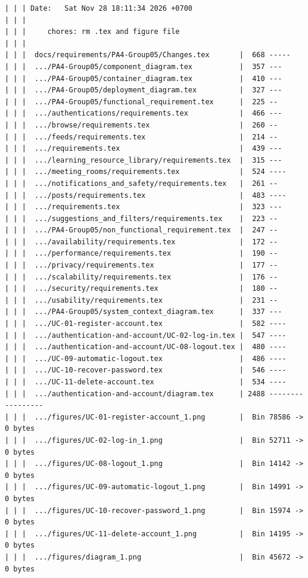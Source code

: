 \documentclass[12pt]{article}
\begin{document}
\begin{lstlisting}[numbers=none,breaklines=true]
| | | Date:   Sat Nov 28 18:11:34 2026 +0700
| | |
| | |     chores: rm .tex and figure file
| | |
| | |  docs/requirements/PA4-Group05/Changes.tex       |  668 -----
| | |  .../PA4-Group05/component_diagram.tex           |  357 ---
| | |  .../PA4-Group05/container_diagram.tex           |  410 ---
| | |  .../PA4-Group05/deployment_diagram.tex          |  327 ---
| | |  .../PA4-Group05/functional_requirement.tex      |  225 --
| | |  .../authentications/requirements.tex            |  466 ---
| | |  .../browse/requirements.tex                     |  260 --
| | |  .../feeds/requirements.tex                      |  214 --
| | |  .../requirements.tex                            |  439 ---
| | |  .../learning_resource_library/requirements.tex  |  315 ---
| | |  .../meeting_rooms/requirements.tex              |  524 ----
| | |  .../notifications_and_safety/requirements.tex   |  261 --
| | |  .../posts/requirements.tex                      |  483 ----
| | |  .../requirements.tex                            |  323 ---
| | |  .../suggestions_and_filters/requirements.tex    |  223 --
| | |  .../PA4-Group05/non_functional_requirement.tex  |  247 --
| | |  .../availability/requirements.tex               |  172 --
| | |  .../performance/requirements.tex                |  190 --
| | |  .../privacy/requirements.tex                    |  177 --
| | |  .../scalability/requirements.tex                |  176 --
| | |  .../security/requirements.tex                   |  180 --
| | |  .../usability/requirements.tex                  |  231 --
| | |  .../PA4-Group05/system_context_diagram.tex      |  337 ---
| | |  .../UC-01-register-account.tex                  |  582 ----
| | |  .../authentication-and-account/UC-02-log-in.tex |  547 ----
| | |  .../authentication-and-account/UC-08-logout.tex |  480 ----
| | |  .../UC-09-automatic-logout.tex                  |  486 ----
| | |  .../UC-10-recover-password.tex                  |  546 ----
| | |  .../UC-11-delete-account.tex                    |  534 ----
| | |  .../authentication-and-account/diagram.tex      | 2488 -----------------
| | |  .../figures/UC-01-register-account_1.png        |  Bin 78586 -> 0 bytes
| | |  .../figures/UC-02-log-in_1.png                  |  Bin 52711 -> 0 bytes
| | |  .../figures/UC-08-logout_1.png                  |  Bin 14142 -> 0 bytes
| | |  .../figures/UC-09-automatic-logout_1.png        |  Bin 14991 -> 0 bytes
| | |  .../figures/UC-10-recover-password_1.png        |  Bin 15974 -> 0 bytes
| | |  .../figures/UC-11-delete-account_1.png          |  Bin 14195 -> 0 bytes
| | |  .../figures/diagram_1.png                       |  Bin 45672 -> 0 bytes

\end{lstlisting}
\end{document}
